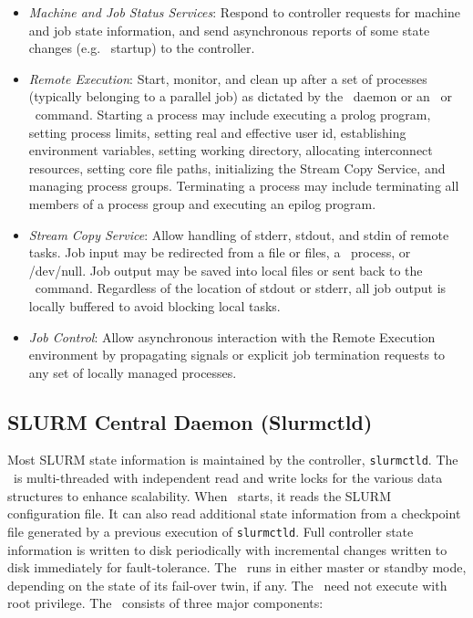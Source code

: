 \begin{itemize}
\item {\em Machine and Job Status Services}:  Respond to controller 
requests for machine and job state information, and send asynchronous 
reports of some state changes (e.g. \slurmd\ startup) to the controller.

\item {\em Remote Execution}: Start, monitor, and clean up after a set
of processes (typically belonging to a parallel job) as dictated by the
\slurmctld\ daemon or an \srun\ or \scancel\ command. Starting a process may
include executing a prolog program, setting process limits, setting real
and effective user id, establishing environment variables, setting working
directory, allocating interconnect resources, setting core file paths,
initializing the Stream Copy Service, and managing
process groups. Terminating a process may include terminating all members
of a process group and executing an epilog program.

\item {\em Stream Copy Service}: Allow handling of stderr, stdout, and
stdin of remote tasks. Job input may be redirected from a file or files, a
\srun\ process, or /dev/null.  Job output may be saved into local files or
sent back to the \srun\ command. Regardless of the location of stdout or stderr,
all job output is locally buffered to avoid blocking local tasks.

\item {\em Job Control}: Allow asynchronous interaction with the
Remote Execution environment by propagating signals or explicit job
termination requests to any set of locally managed processes.

\end{itemize}

\subsection{SLURM Central Daemon (Slurmctld)}

Most SLURM state information is maintained by the controller, {\tt slurmctld}.
The \slurmctld\ is multi-threaded with independent read and write locks 
for the various data structures to enhance scalability. 
When \slurmctld\ starts, it reads the SLURM configuration file.  
It can also read additional state information
from a checkpoint file generated by a previous execution of {\tt slurmctld}.
Full controller state information is written to 
disk periodically with incremental changes written to disk immediately
for fault-tolerance.  
The \slurmctld\ runs in either master or standby mode, depending on the
state of its fail-over twin, if any.
The \slurmctld\ need not execute with root privilege.
The \slurmctld\ consists of three major components:

